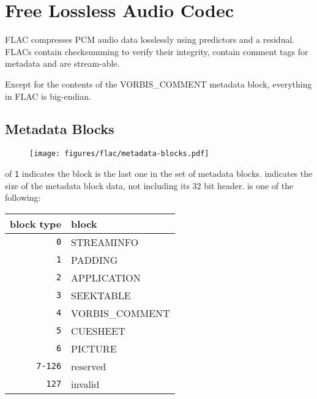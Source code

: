 
\chapter{Free Lossless Audio Codec}
FLAC compresses PCM audio data losslessly using predictors and a
residual.
FLACs contain checksumming to verify their integrity, contain comment tags for
metadata and are stream-able.

Except for the contents of the VORBIS\_COMMENT metadata block, everything in FLAC is big-endian.


\section{Metadata Blocks}
\begin{figure}[h]
  \texttt{[image: figures/flac/metadata-blocks.pdf]}
\end{figure}
\par
\noindent
{} of \texttt{1} indicates the block is the last one
in the set of metadata blocks.
 indicates the size of the metadata block data,
not including its 32 bit header.
 is one of the following:
\begin{table}[h]
\begin{tabular}{r | l}
  block type & block \\
  \hline
  \texttt{0} & STREAMINFO \\
  \texttt{1} & PADDING \\
  \texttt{2} & APPLICATION \\
  \texttt{3} & SEEKTABLE \\
  \texttt{4} & VORBIS\_COMMENT \\
  \texttt{5} & CUESHEET \\
  \texttt{6} & PICTURE \\
  \texttt{7-126} & reserved \\
  \texttt{127} & invalid \\
\end{tabular}
\end{table}

